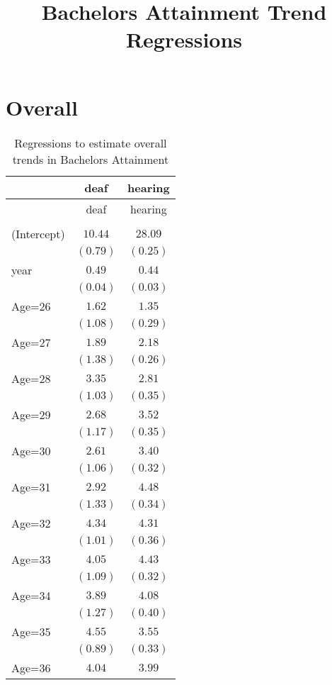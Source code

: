 \documentclass[fullpage]{paper}
\title{ Bachelors Attainment Trend Regressions}
\begin{document}
\section{Overall}

\begin{center}
\begin{longtable}{l c c }
\hline
 & deaf & hearing \\
\hline
\endfirsthead
\hline
 & deaf & hearing \\
\hline
\endhead
\hline
\endfoot
\hline
\multicolumn{3}{l}{\scriptsize{}}\\
\caption{Regressions to estimate overall trends in Bachelors Attainment}
\label{table:coefficients}
\endlastfoot
(Intercept) & $10.44$  & $28.09$  \\
            & $(0.79)$ & $(0.25)$ \\
year        & $0.49$   & $0.44$   \\
            & $(0.04)$ & $(0.03)$ \\
Age=26      & $1.62$   & $1.35$   \\
            & $(1.08)$ & $(0.29)$ \\
Age=27      & $1.89$   & $2.18$   \\
            & $(1.38)$ & $(0.26)$ \\
Age=28      & $3.35$   & $2.81$   \\
            & $(1.03)$ & $(0.35)$ \\
Age=29      & $2.68$   & $3.52$   \\
            & $(1.17)$ & $(0.35)$ \\
Age=30      & $2.61$   & $3.40$   \\
            & $(1.06)$ & $(0.32)$ \\
Age=31      & $2.92$   & $4.48$   \\
            & $(1.33)$ & $(0.34)$ \\
Age=32      & $4.34$   & $4.31$   \\
            & $(1.01)$ & $(0.36)$ \\
Age=33      & $4.05$   & $4.43$   \\
            & $(1.09)$ & $(0.32)$ \\
Age=34      & $3.89$   & $4.08$   \\
            & $(1.27)$ & $(0.40)$ \\
Age=35      & $4.55$   & $3.55$   \\
            & $(0.89)$ & $(0.33)$ \\
Age=36      & $4.04$   & $3.99$   \\

\end{longtable}
\end{center}
\end{document}
